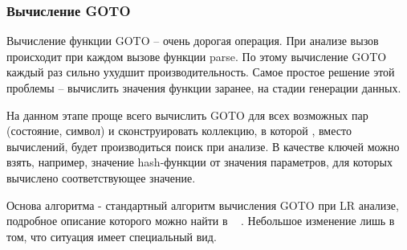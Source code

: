 \subsubsection{Вычисление GOTO}

Вычисление функции GOTO -- очень дорогая операция. При анализе вызов происходит при каждом вызове функции parse. По этому вычисление GOTO каждый раз сильно ухудшит производительность. Самое простое решение этой проблемы -- вычислить значения функции заранее, на стадии генерации данных.

На данном этапе проще всего вычислить GOTO для всех возможных пар (состояние, символ) и сконструировать коллекцию, в которой , вместо вычислений, будет производиться поиск при анализе. В качестве ключей можно взять, например, значение hash-функции от значения параметров, для которых вычислено соответствующее значение.

Основа алгоритма - стандартный алгоритм вычисления GOTO при LR анализе, подробное описание которого можно найти в ~ \cite{DrgBook}. Небольшое изменение лишь в том, что ситуация имеет специальный вид.








